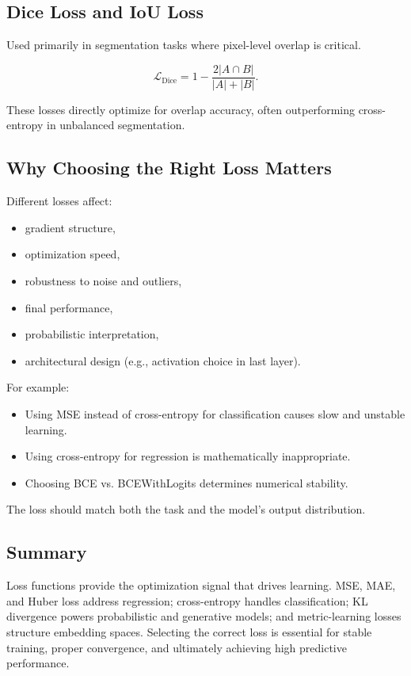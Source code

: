 \documentclass[12pt,a4paper]{report}
\begin{document}
\vspace{1em}
\subsection{Dice Loss and IoU Loss}

Used primarily in segmentation tasks where pixel-level overlap is critical.

\[
\mathcal{L}_{\text{Dice}} = 1 - \frac{2|A \cap B|}{|A| + |B|}.
\]

These losses directly optimize for overlap accuracy, often outperforming cross-entropy in unbalanced segmentation.

\vspace{1em}
\subsection{Why Choosing the Right Loss Matters}

Different losses affect:
\begin{itemize}
    \item gradient structure,
    \item optimization speed,
    \item robustness to noise and outliers,
    \item final performance,
    \item probabilistic interpretation,
    \item architectural design (e.g., activation choice in last layer).
\end{itemize}

For example:
\begin{itemize}
    \item Using MSE instead of cross-entropy for classification causes slow and unstable learning.
    \item Using cross-entropy for regression is mathematically inappropriate.
    \item Choosing BCE vs. BCEWithLogits determines numerical stability.
\end{itemize}

The loss should match both the task and the model's output distribution.

\vspace{1em}
\subsection{Summary}

Loss functions provide the optimization signal that drives learning.  
MSE, MAE, and Huber loss address regression; cross-entropy handles classification; KL divergence powers probabilistic and generative models; and metric-learning losses structure embedding spaces.  
Selecting the correct loss is essential for stable training, proper convergence, and ultimately achieving high predictive performance.
\end{document}
